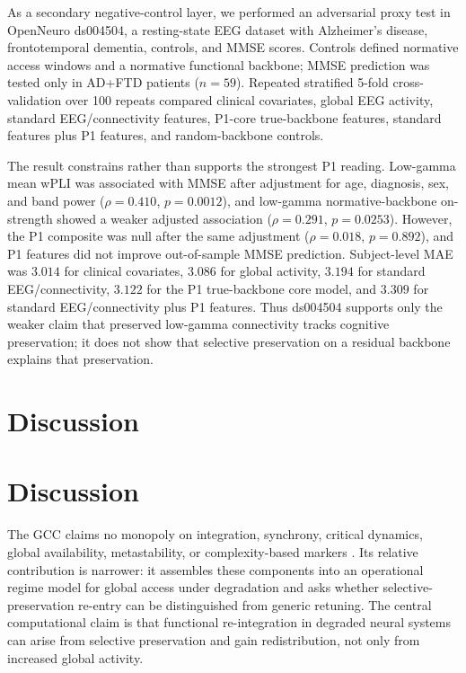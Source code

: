 \documentclass[11pt,a4paper]{article}
\theoremstyle{plain}
\theoremstyle{definition}
\theoremstyle{remark}
\begin{document}
As a secondary negative-control layer, we performed an adversarial proxy test in OpenNeuro ds004504, a resting-state EEG dataset with Alzheimer's disease, frontotemporal dementia, controls, and MMSE scores. Controls defined normative access windows and a normative functional backbone; MMSE prediction was tested only in AD+FTD patients ($n=59$). Repeated stratified 5-fold cross-validation over 100 repeats compared clinical covariates, global EEG activity, standard EEG/connectivity features, P1-core true-backbone features, standard features plus P1 features, and random-backbone controls.

The result constrains rather than supports the strongest P1 reading. Low-gamma mean wPLI was associated with MMSE after adjustment for age, diagnosis, sex, and band power ($\rho = 0.410$, $p = 0.0012$), and low-gamma normative-backbone on-strength showed a weaker adjusted association ($\rho = 0.291$, $p = 0.0253$). However, the P1 composite was null after the same adjustment ($\rho = 0.018$, $p = 0.892$), and P1 features did not improve out-of-sample MMSE prediction. Subject-level MAE was $3.014$ for clinical covariates, $3.086$ for global activity, $3.194$ for standard EEG/connectivity, $3.122$ for the P1 true-backbone core model, and $3.309$ for standard EEG/connectivity plus P1 features. Thus ds004504 supports only the weaker claim that preserved low-gamma connectivity tracks cognitive preservation; it does not show that selective preservation on a residual backbone explains that preservation.


\section*{Discussion}

\section{Discussion}
\label{sec:diskussion}

The GCC claims no monopoly on integration, synchrony, critical dynamics, global availability, metastability, or complexity-based markers \citep{dehaene1998,tononi2004,fries2015,kelso2012,deco2017,casali2013,demertzi2019,carhartharris2014,schartner2015,luppi2019}. Its relative contribution is narrower: it assembles these components into an operational regime model for global access under degradation and asks whether selective-preservation re-entry can be distinguished from generic retuning. The central computational claim is that functional re-integration in degraded neural systems can arise from selective preservation and gain redistribution, not only from increased global activity.
\end{document}
